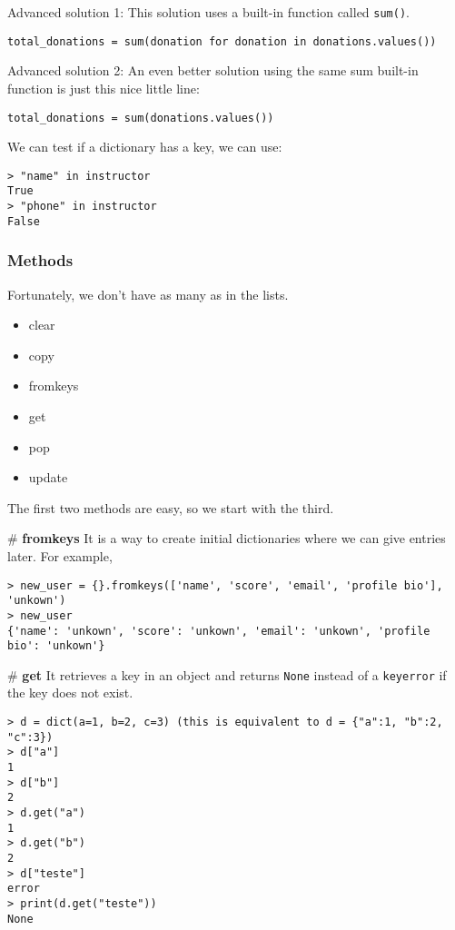 Advanced solution 1: This solution uses a built-in function called \verb|sum()|. 
\begin{verbatim}
total_donations = sum(donation for donation in donations.values())
\end{verbatim}

Advanced solution 2: An even better solution using the same sum built-in function is just this nice little line:
\begin{verbatim}
total_donations = sum(donations.values())
\end{verbatim}

We can test if a dictionary has a key, we can use:
\begin{verbatim}
> "name" in instructor
True
> "phone" in instructor
False
\end{verbatim}


\subsubsection{Methods}

Fortunately, we don't have as many as in the lists. 
\begin{itemize}
	\item clear
	\item copy
	\item fromkeys
	\item get
	\item pop
	\item update
\end{itemize}

The first two methods are easy, so we start with the third. 

\# {\bf fromkeys} It is a way to create initial dictionaries where we can give entries later. For example, 
\begin{verbatim}
> new_user = {}.fromkeys(['name', 'score', 'email', 'profile bio'], 'unkown')
> new_user
{'name': 'unkown', 'score': 'unkown', 'email': 'unkown', 'profile bio': 'unkown'}
\end{verbatim}

\# {\bf get} It retrieves a key in an object and returns \verb|None| instead of a \verb|keyerror| if the key does not exist.
\begin{verbatim}
> d = dict(a=1, b=2, c=3) (this is equivalent to d = {"a":1, "b":2, "c":3})
> d["a"]
1
> d["b"]
2
> d.get("a")
1
> d.get("b") 
2
> d["teste"]
error
> print(d.get("teste"))
None
\end{verbatim}

